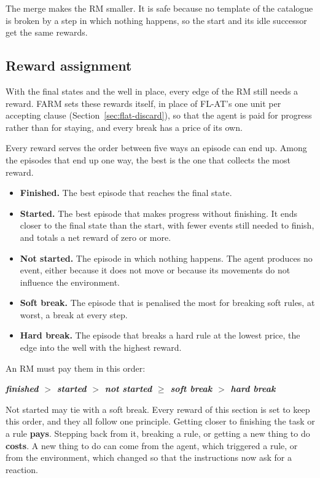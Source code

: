 \documentclass[11pt,english,listoffigures,listoftables]{tfgetsinf}
\newcommand{\keyidea}[1]{\par\smallskip\noindent\hspace*{0.6em}{\color{gray!55}\vrule width 1.5pt}\hspace{8pt}\parbox[t]{\dimexpr\linewidth-0.6em-9.5pt\relax}{\itshape #1}\par\smallskip}  %
\begin{document}
The merge makes the RM smaller. It is safe because no template of the catalogue is broken by a step in which nothing happens, so the start and its idle successor get the same rewards.

\subsection{Reward assignment}
\label{sec:reward-assignment}
With the final states and the well in place, every edge of the RM still needs a reward. FARM sets these rewards itself, in place of FL-AT's one unit per accepting clause (Section~\ref{sec:flat-discard}), so that the agent is paid for progress rather than for staying, and every break has a price of its own.

Every reward serves the order between five ways an episode can end up. Among the episodes that end up one way, the best is the one that collects the most reward.

\begin{itemize}
    \item \textbf{Finished.} The best episode that reaches the final state.
    \item \textbf{Started.} The best episode that makes progress without finishing. It ends closer to the final state than the start, with fewer events still needed to finish, and totals a net reward of zero or more.
    \item \textbf{Not started.} The episode in which nothing happens. The agent produces no event, either because it does not move or because its movements do not influence the environment.
    \item \textbf{Soft break.} The episode that is penalised the most for breaking soft rules, at worst, a break at every step.
    \item \textbf{Hard break.} The episode that breaks a hard rule at the lowest price, the edge into the well with the highest reward.
\end{itemize}

An RM must pay them in this order:

\keyidea{\centering\upshape\bfseries\boldmath finished $>$ started $>$ not started $\geq$ soft break $>$ hard break}
\noindent Not started may tie with a soft break. Every reward of this section is set to keep this order, and they all follow one principle. Getting closer to finishing the task or a rule \textbf{pays}. Stepping back from it, breaking a rule, or getting a new thing to do \textbf{costs}. A new thing to do can come from the agent, which triggered a rule, or from the environment, which changed so that the instructions now ask for a reaction.
\end{document}
